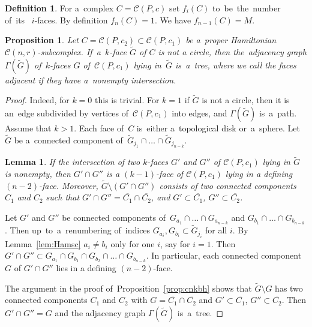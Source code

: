 \documentclass[12pt]{amsart}
\newtheorem{proposition}[formula]{Proposition}
\newtheorem{lemma}[formula]{Lemma}
\theoremstyle{definition}
\newtheorem{definition}[formula]{Definition}
\theoremstyle{remark}
\begin{document}
\begin{definition}
For a~complex $C=\mathcal{C}(P,c)$ set $f_i(C)$ to~be~the~number of~its~ $i$-faces. By definition $f_n(C)=1$.
We have $f_{n-1}(C)=M$.
\end{definition}

\begin{proposition}\label{prop:treek}
Let $C=\mathcal{C}(P,c_2)\subset \mathcal{C}(P,c_1)$ be a~proper Hamiltonian \linebreak 
$\mathcal{C}(n,r)$-subcomplex. If~a~$k$-face 
$\widetilde{G}$ of $C$ is not a circle, then the~adjacency graph $\Gamma(\widetilde{G})$ of~$k$-faces 
$G$ of~$\mathcal{C}(P,c_1)$ lying in~$\widetilde{G}$ is~a~tree, where we call the faces adjacent if they have 
a~nonempty intersection.
\end{proposition}
\begin{proof}
Indeed, for $k=0$ this is trivial. For $k=1$ if $\widetilde{G}$ is not a circle, then it is an~edge subdivided 
by vertices of~$\mathcal{C}(P,c_1)$ into edges, and  $\Gamma(\widetilde{G})$ is~a~path.
Assume that $k>1$. Each face of~$C$ is~either a~topological disk or~a~sphere.
Let $\widetilde{G}$ be a~connected component of~$\widetilde{G}_{j_1}\cap\dots\cap \widetilde{G}_{j_{n-k}}$.
\begin{lemma}
If the intersection of two $k$-faces $G'$ and $G''$ of $\mathcal{C}(P,c_1)$ lying in $\widetilde{G}$
is nonempty, then $G'\cap G''$ is a $(k-1)$-face of $\mathcal{C}(P,c_1)$ lying in a defining $(n-2)$-face.
Moreover, $\widetilde{G}\setminus(G'\cap G'')$ consists of two connected components $C_1$ and $C_2$
such that $G'\cap G''=\overline{C_1}\cap \overline{C_2}$, and $G'\subset \overline{C_1}$, $G''\subset \overline{C_2}$.
\end{lemma}
Let $G'$ and $G''$ be connected components of~$G_{a_1}\cap\dots\cap G_{a_{n-k}}$ and $G_{b_1}\cap\dots\cap G_{b_{n-k}}$.
Then up~to~a~renumbering of~indices $G_{a_i},G_{b_i}\subset \widetilde{G}_{j_i}$ for all $i$.
By Lemma~\ref{lem:Hamsc} $a_i\ne b_i$ only for one $i$, say for $i=1$. Then 
$G'\cap G''\subset G_{a_1}\cap G_{b_1}\cap G_{b_2}\cap \dots\cap G_{b_{n-k}}$. In particular, each connected 
component $G$ of $G'\cap G''$ lies in a defining $(n-2)$-face.


The argument in the proof of~Proposition~\ref{prop:cnkbh} shows 
that $\widetilde{G}\setminus G$ has two connected components $C_1$ and $C_2$ with
$G=\overline{C_1}\cap \overline{C_2}$ and $G'\subset \overline{C_1}$, $G''\subset \overline{C_2}$.
Then $G'\cap G''=G$ and the adjacency graph $\Gamma(\widetilde{G})$ is~a~tree.
\end{proof}
\end{document}
